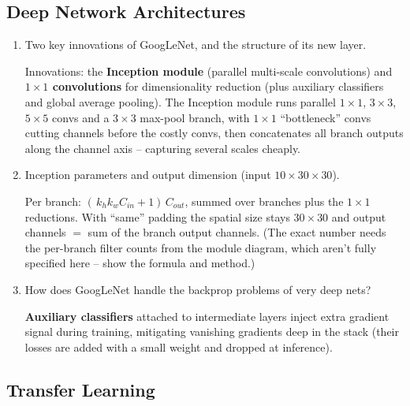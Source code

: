 \documentclass[10pt,a4paper]{article}
\newcommand{\q}[1]{\item #1}
\begin{document}
\subsection{Deep Network Architectures}

\begin{enumerate}[leftmargin=*,label=\textbf{Q\arabic*.}]

\q Two key innovations of GoogLeNet, and the structure of its new layer.
\begin{answerbox}
Innovations: the \textbf{Inception module} (parallel multi-scale convolutions) and \textbf{$1\times1$ convolutions} for dimensionality reduction (plus auxiliary classifiers and global average pooling). The Inception module runs parallel $1\times1$, $3\times3$, $5\times5$ convs and a $3\times3$ max-pool branch, with $1\times1$ ``bottleneck'' convs cutting channels before the costly convs, then concatenates all branch outputs along the channel axis -- capturing several scales cheaply.
\end{answerbox}

\q Inception parameters and output dimension (input $10\times30\times30$).
\begin{answerbox}
Per branch: $(\,k_h k_w C_{in}+1)\,C_{out}$, summed over branches plus the $1\times1$ reductions. With ``same'' padding the spatial size stays $30\times30$ and output channels $=$ sum of the branch output channels. (The exact number needs the per-branch filter counts from the module diagram, which aren't fully specified here -- show the formula and method.)
\end{answerbox}

\q How does GoogLeNet handle the backprop problems of very deep nets?
\begin{answerbox}
\textbf{Auxiliary classifiers} attached to intermediate layers inject extra gradient signal during training, mitigating vanishing gradients deep in the stack (their losses are added with a small weight and dropped at inference).
\end{answerbox}

\end{enumerate}

\subsection{Transfer Learning}
\end{document}
